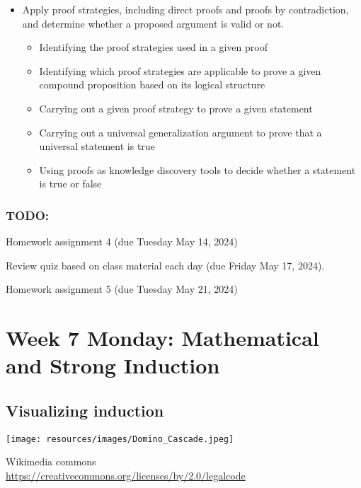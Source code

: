\documentclass[12pt, oneside]{article}
\begin{document}
\begin{itemize}
\item Apply proof strategies, including direct proofs and proofs by contradiction, and determine whether a proposed argument is valid or not.
\begin{itemize}
    \item Identifying the proof strategies used in a given proof
    \item Identifying which proof strategies are applicable to prove a given compound proposition based on its logical structure
    \item Carrying out a given proof strategy to prove a given statement
    \item Carrying out a universal generalization argument to prove that a universal statement is true
    \item Using proofs as knowledge discovery tools to decide whether a statement is true or false
\end{itemize}
\end{itemize}

\subsubsection*{TODO:}
\begin{list}
   {\itemsep2pt}
   \item Homework assignment 4 (due Tuesday May 14, 2024)
   \item Review quiz based on class material each day (due Friday May 17, 2024).
   \item Homework assignment 5 (due Tuesday May 21, 2024)
\end{list}

\newpage

\section*{Week 7 Monday: Mathematical and Strong Induction}
\subsection*{Visualizing induction}


\begin{center}
    \texttt{[image: resources/images/Domino\_Cascade.jpeg]}

    {\tiny Wikimedia commons\\ \href{https://creativecommons.org/licenses/by/2.0/legalcode}{https://creativecommons.org/licenses/by/2.0/legalcode} }
\end{center} 
\end{document}
